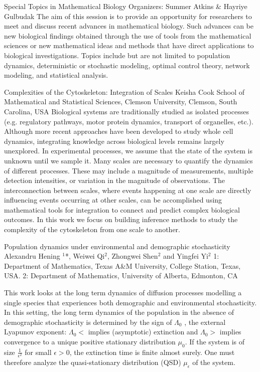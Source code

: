 \label{mini23}


\miniabs
{Special Topics in Mathematical Biology}
{Organizers: Summer Atkins \& Hayriye Gulbudak}
{The aim of this session is to provide an opportunity for researchers to meet and discuss recent advances in mathematical biology. Such advances can be new biological findings obtained through the use of tools from the mathematical sciences or  new mathematical ideas and methods that have direct applications to biological investigations. Topics include but are not limited to population dynamics, deterministic or stochastic modeling, optimal control theory, network modeling, and statistical analysis.}


\begin{addmargin}[2em]{0em}
\vspace{2ex}
\abs
{Complexities of the Cytoskeleton: Integration of Scales}
{Keisha Cook}
{School of Mathematical and Statistical Sciences, Clemson University, Clemson, South Carolina, USA}
{Biological systems are traditionally studied as isolated processes (e.g. regulatory pathways, motor protein dynamics, transport of organelles, etc.). Although more recent approaches have been developed to study whole cell dynamics, integrating knowledge across biological levels remains largely unexplored. In experimental processes, we assume that the state of the system is unknown until we sample it. Many scales are necessary to quantify the dynamics of different processes. These may include a magnitude of measurements, multiple detection intensities, or variation in the magnitude of observations. The interconnection between scales, where events happening at one scale are directly influencing events occurring at other scales, can be accomplished using mathematical tools for integration to connect and predict complex biological outcomes. In this work we focus on building inference methods to study the complexity of the cytoskeleton from one scale to another. }


\vspace{1.5ex}
\abs
{Population dynamics under environmental and demographic stochasticity}
{Alexandru Hening {$^{1}$*}, Weiwei Qi{$^{2}$}, Zhongwei Shen{$^{2}$} and Yingfei Yi{$^{2}$}}
{1: Department of Mathematics, Texas A\&M University, College Station, Texas, USA. 2: Department of Mathematics,  University of Alberta, Edmonton, CA}
{This work looks at the long term dynamics of diffusion processes modelling a single species that experiences both demographic and environmental stochasticity. In this setting, the long term dynamics of the population in the absence of demographic stochasticity is determined by the sign of $\Lambda_0$ , the external Lyapunov exponent: $\Lambda_0<$ implies (asymptotic) extinction and $\Lambda_0>$  implies convergence to a unique positive stationary distribution $\mu_0$. If the system is of size $\frac{1}{\epsilon^2}$ for small $\epsilon>0$, the extinction time is finite almost surely. One must therefore analyze the quasi-stationary distribution (QSD) $\mu_\epsilon$ of the system.

}
\end{addmargin}
